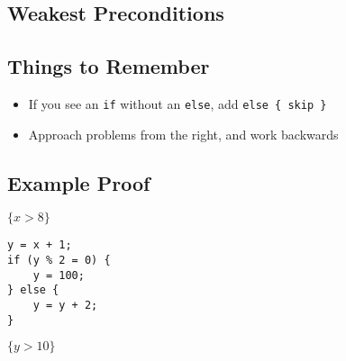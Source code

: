 \documentclass[landscape]{cheat}
\begin{document}
\begin{multicols*}{3}
\section{Weakest Preconditions}

\subsection{Things to Remember}
\begin{itemize}
    \item If you see an \texttt{if} without an \texttt{else}, add \texttt{else \{ skip \}}
    \item Approach problems from the right, and work backwards
\end{itemize}

\subsection{Example Proof}
$\{ x > 8 \}$
\begin{lstlisting}
y = x + 1;
if (y % 2 = 0) {
    y = 100;
} else {
    y = y + 2;
}
\end{lstlisting}
$\{y > 10\}$


\end{multicols*}
\end{document}
